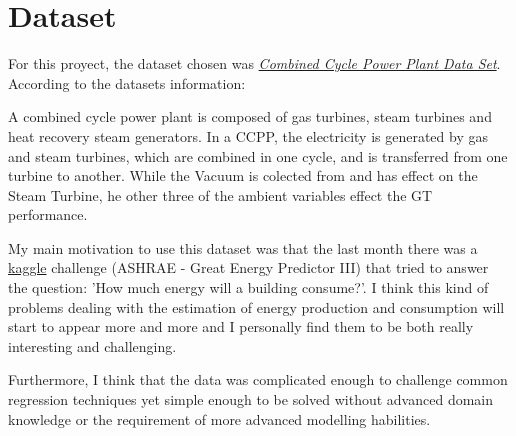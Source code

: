 




\section{Dataset}

For this proyect, the dataset chosen was \href{https://archive.ics.uci.edu/ml/datasets/Combined+Cycle+Power+Plant}{\textit{Combined Cycle Power Plant Data Set}}. According to the datasets information:

\begin{displayquote}
A combined cycle power plant is composed of gas turbines, steam turbines and heat recovery steam generators. In a CCPP, the electricity is generated by gas and steam turbines, which are combined in one cycle, and is transferred from one turbine to another. While the Vacuum is colected from and has effect on the Steam Turbine, he other three of the ambient variables effect the GT performance.
\end{displayquote}

My main motivation to use this dataset was that the last month there was a \href{https://www.kaggle.com/c/ashrae-energy-prediction/overview}{kaggle} challenge (ASHRAE - Great Energy Predictor III) that tried to answer the question: 'How much energy will a building consume?'. I think this kind of problems dealing with the estimation of energy production and consumption will start to appear more and more and I personally find them to be both really interesting and challenging.

Furthermore, I think that the data was complicated enough to challenge common regression techniques yet simple enough to be solved without advanced domain knowledge or the requirement of more advanced modelling habilities.
